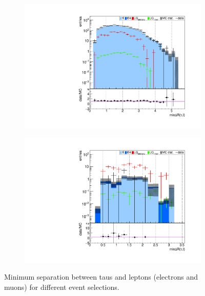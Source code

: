 \begin{figure}
\begin{subfigure}[t]{0.49\textwidth}
                \label{mindR:taulepton:2b2tau}
                \end{subfigure}
                \begin{subfigure}[t]{0.49\textwidth}
                \includegraphics[width=\textwidth]{figures/plots/kinLQ75/mindR_taulepton_2j1b_1tau.pdf}
                \label{mindR:taulepton:1b1tau}
                \end{subfigure}
                \begin{subfigure}[t]{0.49\textwidth}
                \includegraphics[width=\textwidth]{figures/plots/kinLQ75/mindR_taulepton_2j1b_2tau.pdf}
                \label{mindR:taulepton:1b2tau}
                \end{subfigure}
\caption[Minimum separation between taus and leptons (electrons and muons) for different event selections.]{Minimum separation between taus and leptons (electrons and muons) for different event selections.}
\label{mindR:taulepton}
\end{figure}
